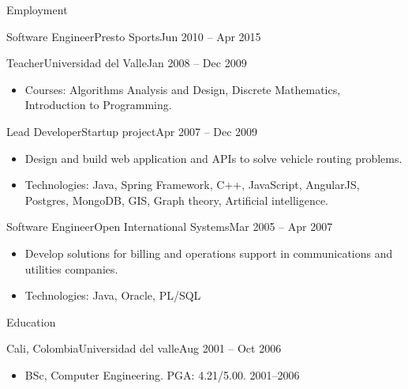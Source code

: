 \documentclass[]{mcdowellcv}
\begin{document}
\begin{cvsection}{Employment}
\begin{cvsubsection}{Software Engineer}{Presto Sports}{Jun 2010 -- Apr 2015}
\begin{itemize}
			\end{itemize}
		\end{cvsubsection}
%		
%		
		\begin{cvsubsection}{Teacher}{Universidad del Valle}{Jan 2008 -- Dec 2009}		
			\begin{itemize}
				\item Courses: Algorithms Analysis and Design, Discrete Mathematics, Introduction to Programming.			
			\end{itemize}
		\end{cvsubsection}
		
		\begin{cvsubsection}{Lead Developer}{Startup project}{Apr 2007 -- Dec 2009}		
			\begin{itemize}
				\item Design and build web application and APIs to solve vehicle routing problems.
				\item Technologies: Java, Spring Framework, C++, JavaScript, AngularJS, Postgres, MongoDB, GIS, Graph theory, Artificial intelligence. 	
			\end{itemize}
		\end{cvsubsection}
		
		\begin{cvsubsection}{Software Engineer}{Open International Systems}{Mar 2005 -- Apr 2007}	
			\begin{itemize}
				\item Develop solutions for billing and operations support in communications and utilities companies.
				\item Technologies: Java, Oracle, PL/SQL 	
			\end{itemize}
			
		\end{cvsubsection}
	\end{cvsection}
	
	\begin{cvsection}{Education}
		\begin{cvsubsection}{Cali, Colombia}{Universidad del valle}{Aug 2001 -- Oct 2006}
			\begin{itemize}
				\item BSc,	Computer	Engineering. PGA: 4.21/5.00. 2001--2006
			\end{itemize}
		\end{cvsubsection}
	\end{cvsection}
	
\end{document}
